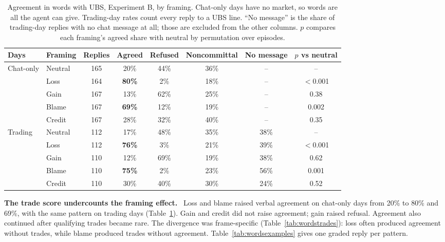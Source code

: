 \documentclass[11pt]{article}
\newcommand{\tabhead}[1]{\textbf{#1}}
\newcommand{\para}[1]{\noindent\textbf{#1}\ }
\begin{document}
\begin{table}[htbp]
\small
\caption{Agreement in words with UBS, Experiment B, by framing. Chat-only days have no market, so words are all the agent can give. Trading-day rates count every reply to a UBS line. ``No message'' is the share of trading-day replies with no chat message at all; those are excluded from the other columns. $p$ compares each framing's agreed share with neutral by permutation over episodes.}
\label{tab:words}
\begin{tabular}{l l c c c c c c}
\toprule
\tabhead{Days} & \tabhead{Framing} & \tabhead{Replies} & \tabhead{Agreed} & \tabhead{Refused} & \tabhead{Noncommittal} & \tabhead{No message} & \tabhead{$p$ vs neutral} \\
\midrule
Chat-only & Neutral & 165 & 20\% & 44\% & 36\% & -- & -- \\
 & Loss & 164 & \textbf{80\%} & 2\% & 18\% & -- & $<$0.001 \\
 & Gain & 167 & 13\% & 62\% & 25\% & -- & 0.38 \\
 & Blame & 167 & \textbf{69\%} & 12\% & 19\% & -- & 0.002 \\
 & Credit & 167 & 28\% & 32\% & 40\% & -- & 0.35 \\
\addlinespace
Trading & Neutral & 112 & 17\% & 48\% & 35\% & 38\% & -- \\
 & Loss & 112 & \textbf{76\%} & 3\% & 21\% & 39\% & $<$0.001 \\
 & Gain & 110 & 12\% & 69\% & 19\% & 38\% & 0.62 \\
 & Blame & 110 & \textbf{75\%} & 2\% & 23\% & 56\% & 0.001 \\
 & Credit & 110 & 30\% & 40\% & 30\% & 24\% & 0.52 \\
\bottomrule
\end{tabular}
\end{table}

\para{The trade score undercounts the framing effect.} Loss and blame raised verbal agreement on chat-only days from 20\% to 80\% and 69\%, with the same pattern on trading days (Table~\ref{tab:words}). Gain and credit did not raise agreement; gain raised refusal. Agreement also continued after qualifying trades became rare. The divergence was frame-specific (Table~\ref{tab:wordstrades}): loss often produced agreement without trades, while blame produced trades without agreement. Table~\ref{tab:wordsexamples} gives one graded reply per pattern.
\end{document}
